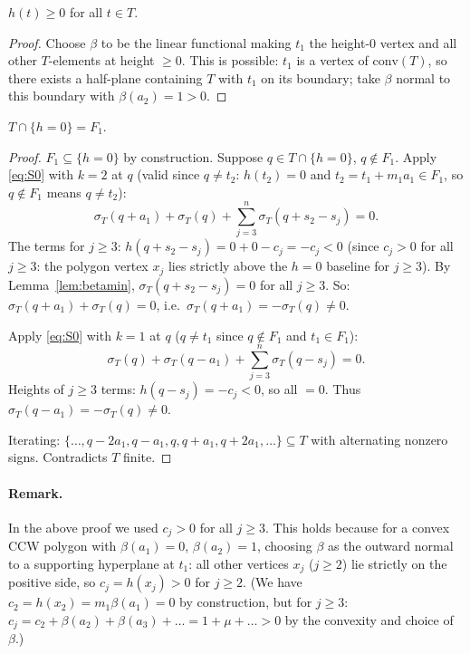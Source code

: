 \begin{lemma}[betamin]\label{lem:betamin}
$h(t) \geq 0$ for all $t \in T$.
\end{lemma}
\begin{proof}
Choose $\beta$ to be the linear functional making $t_1$ the height-$0$ vertex and
all other $T$-elements at height $\geq 0$.  This is possible: $t_1$ is a vertex of
$\mathrm{conv}(T)$, so there exists a half-plane containing $T$ with $t_1$ on its
boundary; take $\beta$ normal to this boundary with $\beta(a_2)=1>0$.
\end{proof}

\begin{lemma}[hzero]\label{lem:hzero}
$T \cap \{h = 0\} = F_1$.
\end{lemma}
\begin{proof}
$F_1 \subseteq \{h=0\}$ by construction.  Suppose $q \in T \cap \{h=0\}$, $q \notin F_1$.
Apply \eqref{eq:S0} with $k=2$ at $q$ (valid since $q \neq t_2$: $h(t_2)=0$ and
$t_2 = t_1+m_1a_1 \in F_1$, so $q \notin F_1$ means $q \neq t_2$):
\[
  \sigma_T(q+a_1) + \sigma_T(q) + \sum_{j=3}^n \sigma_T(q+s_2-s_j) = 0.
\]
The terms for $j \geq 3$: $h(q + s_2 - s_j) = 0 + 0 - c_j = -c_j < 0$
(since $c_j > 0$ for all $j \geq 3$: the polygon vertex $x_j$ lies strictly above the
$h=0$ baseline for $j \geq 3$).
By Lemma~\ref{lem:betamin}, $\sigma_T(q+s_2-s_j) = 0$ for all $j \geq 3$.
So: $\sigma_T(q+a_1) + \sigma_T(q) = 0$, i.e.\ $\sigma_T(q+a_1) = -\sigma_T(q) \neq 0$.

Apply \eqref{eq:S0} with $k=1$ at $q$ ($q \neq t_1$ since $q \notin F_1$ and $t_1 \in F_1$):
\[
  \sigma_T(q) + \sigma_T(q-a_1) + \sum_{j=3}^n \sigma_T(q-s_j) = 0.
\]
Heights of $j \geq 3$ terms: $h(q-s_j) = -c_j < 0$, so all $= 0$.
Thus $\sigma_T(q-a_1) = -\sigma_T(q) \neq 0$.

Iterating: $\{\ldots, q-2a_1, q-a_1, q, q+a_1, q+2a_1, \ldots\} \subseteq T$ with alternating nonzero signs.  Contradicts $T$ finite.
\end{proof}

\paragraph{Remark.}
In the above proof we used $c_j > 0$ for all $j \geq 3$.  This holds because for a
convex CCW polygon with $\beta(a_1)=0$, $\beta(a_2)=1$, choosing $\beta$ as the
outward normal to a supporting hyperplane at $t_1$: all other vertices $x_j$ ($j \geq 2$)
lie strictly on the positive side, so $c_j = h(x_j) > 0$ for $j \geq 2$.
(We have $c_2 = h(x_2) = m_1 \beta(a_1) = 0$ by construction, but for $j \geq 3$:
$c_j = c_2 + \beta(a_2) + \beta(a_3) + \ldots = 1 + \mu + \ldots > 0$ by the convexity
and choice of $\beta$.)

